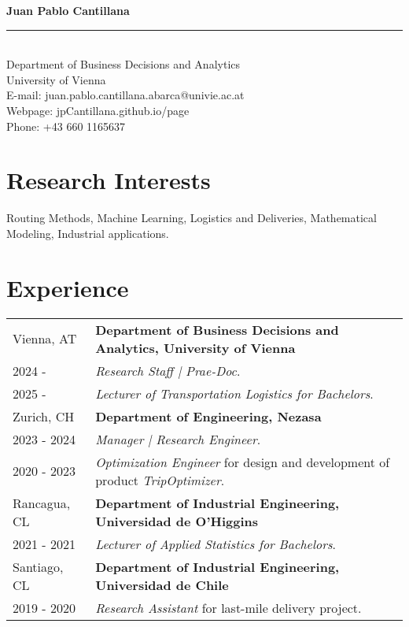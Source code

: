 \documentclass[10pt, a4paper]{article}
\begin{document}
\begin{center}
    {\LARGE \textbf{Juan Pablo Cantillana}} \\[0.2cm]
    \rule{\textwidth}{0.4pt} \\[0.2cm] %
    Department of Business Decisions and Analytics \\
    University of Vienna \\
    E-mail: juan.pablo.cantillana.abarca@univie.ac.at \\
    Webpage: jpCantillana.github.io/page\\
    Phone: +43 660 1165637\\
\end{center}

\section*{Research Interests}
Routing Methods, Machine Learning, Logistics and Deliveries, Mathematical Modeling, Industrial applications.

\section*{Experience}

\noindent
\begin{tabular}{@{} p{} p{} @{}}
    Vienna, AT & \textbf{Department of Business Decisions and Analytics, University of Vienna} \\
    2024 -  & \textit{Research Staff | Prae-Doc}. \\
    2025 -  & \textit{Lecturer of Transportation Logistics for Bachelors}. \\
    Zurich, CH & \textbf{Department of Engineering, Nezasa} \\
    2023 - 2024 & \textit{Manager | Research Engineer}. \\
    2020 - 2023 & \textit{Optimization Engineer} for design and development of product \textit{TripOptimizer}.\\
    Rancagua, CL & \textbf{Department of Industrial Engineering, Universidad de O'Higgins} \\
    2021 - 2021 & \textit{Lecturer of Applied Statistics for Bachelors}. \\
    Santiago, CL & \textbf{Department of Industrial Engineering, Universidad de Chile} \\
    2019 - 2020 & \textit{Research Assistant} for last-mile delivery project.\\
\end{tabular}
\end{document}
